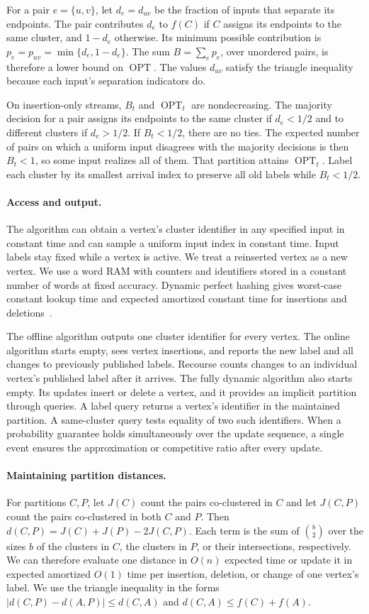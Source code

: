 \documentclass[11pt]{article}
\newcommand{\OPT}{\operatorname{OPT}}
\begin{document}
For a pair $e=\{u,v\}$, let $d_e=d_{uv}$ be the fraction of inputs
that separate its endpoints. The pair contributes $d_e$ to $f(C)$ if
$C$ assigns its endpoints to the same cluster, and $1-d_e$ otherwise. Its minimum possible contribution
is $p_e=p_{uv}=\min\{d_e,1-d_e\}$. The sum $B=\sum_e p_e$, over unordered
pairs, is therefore a lower bound on $\OPT$. The values $d_{uv}$ satisfy
the triangle inequality because each input's separation indicators do.

On insertion-only streams, $B_t$ and $\OPT_t$ are nondecreasing. The
majority decision for a pair assigns its endpoints to the same cluster
if $d_e<1/2$ and to different clusters if $d_e>1/2$. If $B_t<1/2$, there are no ties. The expected number of
pairs on which a uniform input disagrees with the majority decisions
is then $B_t<1$, so some input realizes all of them. That partition
attains $\OPT_t$. Label each cluster by its smallest arrival index to
preserve all old labels while $B_t<1/2$.

\paragraph{Access and output.}
The algorithm can obtain a vertex's cluster identifier in any specified
input in constant time and can sample a uniform input index in constant
time. Input labels stay fixed while a vertex is active. We treat a
reinserted vertex as a new vertex. We use a word RAM with counters and identifiers stored
in a constant number of words at fixed accuracy. Dynamic perfect
hashing gives worst-case constant lookup time and expected amortized
constant time for insertions and deletions~\cite{Dietzfelbinger1994}.

The offline algorithm outputs one cluster identifier for every vertex.
The online algorithm starts empty, sees vertex insertions, and reports
the new label and all changes to previously published labels. Recourse
counts changes to an individual vertex's published label after it
arrives. The fully dynamic algorithm also starts empty. Its updates
insert or delete a vertex, and it provides an implicit partition
through queries. A label query returns a vertex's identifier in the
maintained partition. A same-cluster query tests equality of two such
identifiers. When a probability guarantee holds simultaneously over the update
sequence, a single event ensures the approximation or competitive ratio
after every update.

\paragraph{Maintaining partition distances.}
For partitions $C,P$, let $J(C)$ count the pairs co-clustered in $C$
and let $J(C,P)$ count the pairs co-clustered in both $C$ and $P$. Then
$d(C,P)=J(C)+J(P)-2J(C,P)$. Each term is the sum of $\binom b2$
over the sizes $b$ of the clusters in $C$, the clusters in $P$, or
their intersections, respectively. We can therefore evaluate one
distance in $O(n)$ expected time or update it in expected amortized
$O(1)$ time per insertion, deletion, or change of one vertex's label.
We use the triangle inequality in the forms
$|d(C,P)-d(A,P)|\le d(C,A)$ and $d(C,A)\le f(C)+f(A)$.
\end{document}
